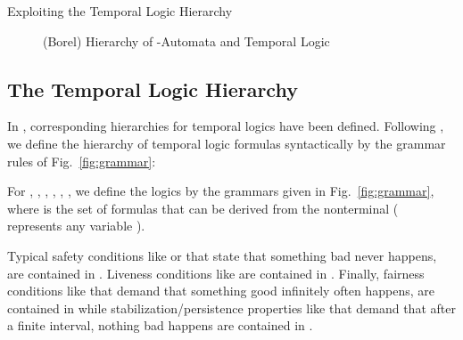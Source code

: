 \documentclass[copyright,creativecommons]{eptcs}
\begin{document}
\begin{section}{Exploiting the Temporal Logic Hierarchy}
\begin{figure}
\caption{(Borel) Hierarchy of -Automata and Temporal Logic}
\label{fig:automata_hierarchy}
\end{figure}









\subsection{The Temporal Logic Hierarchy}

In \cite{ChMP92,Schn01b,Schn03}, corresponding hierarchies for temporal logics have been defined.  Following \cite{Schn01b,Schn03}, we define the hierarchy of temporal logic formulas syntactically by the grammar rules of Fig.~\ref{fig:grammar}:

\begin{figure*}[!th] 
\caption{Syntactic Characterizations of the Classes of the Temporal Logic Hierarchy}
\label{fig:grammar}
\end{figure*}


\begin{definition} \label{temp_borel_1_def}
For , , , , , , we define the logics  by the grammars given in Fig.~\ref{fig:grammar}, where  is the set of formulas that can be derived from the nonterminal  ( represents any variable ).
\end{definition}

\noindent Typical safety conditions like  or  that state that something bad never happens, are contained in . Liveness conditions like  are contained in . Finally, fairness conditions like  that demand that something good infinitely often happens, are contained in  while stabilization/persistence properties like  that demand that after a finite interval, nothing bad happens are contained in .


\end{section}
\end{document}
